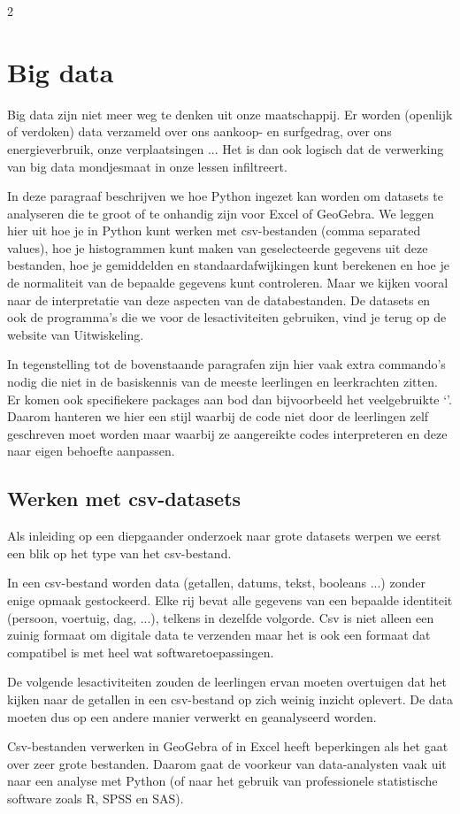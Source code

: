     \begin{multicols}{2}



\section{Big data}
    Big data zijn niet meer weg te denken uit onze maatschappij. Er worden (openlijk of verdoken) data verzameld over ons aankoop- en surfgedrag, over ons energieverbruik, onze verplaatsingen ... Het is dan ook logisch dat de verwerking van big data mondjesmaat in onze lessen infiltreert.
    
    In deze paragraaf beschrijven we hoe Python ingezet kan worden om datasets te analyseren die te groot of te onhandig zijn voor Excel of GeoGebra. We leggen hier uit hoe je in Python kunt werken met csv-bestanden (comma separated values), hoe je histogrammen kunt maken van geselecteerde gegevens uit deze bestanden, hoe je gemiddelden en standaardafwijkingen kunt berekenen en hoe je de normaliteit van de bepaalde gegevens kunt controleren. Maar we kijken vooral naar de interpretatie van deze aspecten van de databestanden. De datasets en ook de programma's die we voor de lesactiviteiten gebruiken, vind je terug op de website van Uitwiskeling. 
    
    In tegenstelling tot de bovenstaande paragrafen zijn hier vaak extra commando's nodig die niet in de basiskennis van de meeste leerlingen en leerkrachten zitten. Er komen ook specifiekere  packages aan bod dan bijvoorbeeld het veelgebruikte `'. Daarom hanteren we hier een stijl waarbij de code niet door de leerlingen zelf geschreven moet worden maar waarbij ze aangereikte codes interpreteren en deze naar eigen behoefte aanpassen.

\subsection{Werken met csv-datasets}

    Als inleiding op een diepgaander onderzoek naar grote datasets werpen we eerst een blik op het type van het csv-bestand.

    In een csv-bestand worden data (getallen, datums, tekst, booleans ...) zonder enige opmaak gestockeerd. Elke rij bevat alle gegevens van een bepaalde identiteit (persoon, voertuig, dag, ...), telkens in dezelfde volgorde. Csv is niet alleen een zuinig formaat om digitale data te verzenden maar het is ook een formaat dat compatibel is met heel wat softwaretoepassingen. 
    
    De volgende lesactiviteiten zouden de leerlingen ervan moeten overtuigen dat het kijken naar de getallen in een csv-bestand op zich weinig inzicht oplevert. De data moeten dus op een andere manier verwerkt en geanalyseerd worden. 
    
    Csv-bestanden verwerken in GeoGebra of in Excel heeft beperkingen als het gaat over zeer grote bestanden. Daarom gaat de voorkeur van data-analysten vaak uit naar een analyse met Python (of naar het gebruik van professionele statistische software zoals R, SPSS en SAS). 

\end{multicols}
